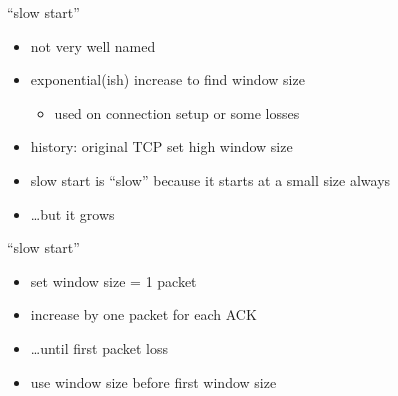\begin{frame}{``slow start''}
    \begin{itemize}
    \item not very well named
    \vspace{.5cm}
    \item exponential(ish) increase to find window size 
        \begin{itemize}
        \item used on connection setup or some losses
        \end{itemize}
    \vspace{.5cm}
    \item history: original TCP set high window size
    \item slow start is ``slow'' because it starts at a small size always
    \item \ldots but it grows 
    \end{itemize}
\end{frame}

\begin{frame}{``slow start''}
    \begin{itemize}
    \item set window size = 1 packet
    \item increase by one packet for each ACK
    \item \ldots until first packet loss
    \item use window size before first window size
    \end{itemize}
\end{frame}

